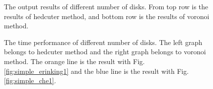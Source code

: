 \documentclass[11pt]{article}
\begin{document}
\begin{figure}[hbt]
{    \label{fig:squirrel_5000-v}
  }\hspace{-3mm}
    \caption{The output results of different number of disks. From top row is the results of hedcuter method, and bottom row is the results of voronoi method. \label{fig:cat_numdisks}}
\end{figure}
\begin{figure}[hbt]
 \centering
 \hspace{-3mm}
    \caption{The time performance of different number of disks. The left graph belongs to hedcuter method and the right graph belongs to voronoi method. The orange line is the result with Fig. \ref{fig:simple_erinking1} and the blue line is the result with Fig. \ref{fig:simple_che1}. \label{fig:num_time}}
\end{figure}
\end{document}

